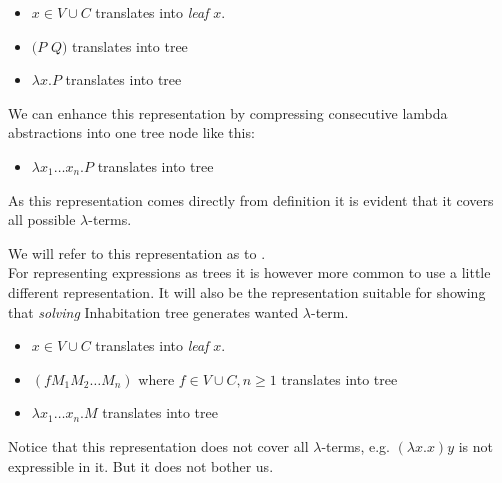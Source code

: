 \documentclass[12pt,a4paper]{report}
\newcommand{\lterm}{$\lambda$-term\xspace}
\newcommand{\lterms}{$\lambda$-terms\xspace}
\begin{document}
\begin{itemize}
	\item $x \in V \cup C$ translates into \textit{leaf} $x$.
	\item $(P$ $Q)$ translates into tree\\
	\item $\lambda x . P$ translates into tree\\
\end{itemize}

We can enhance this representation by compressing consecutive lambda abstractions into one
tree node like this: 

\begin{itemize}
	\item $\lambda x_1 \dots x_n . P$ translates into tree\\
\end{itemize}

As this representation comes directly from definition it is evident 
that it covers all possible \lterms.

We will refer to this representation as to \textit{\atTree}.\\
 

For representing expressions as trees it is however more common to use a little different
representation. It will also be the representation suitable for showing 
that \textit{solving} Inhabitation tree generates wanted \lterm.

\begin{itemize}
    \item $x \in V \cup C$ translates into \textit{leaf} $x$.
	\item $(f M_1 M_2 \dots M_n)$ where $f \in V \cup C, n \geq 1$ translates into tree\\
	\item $\lambda x_1 \dots x_n . M$ translates into tree\\
\end{itemize}

Notice that this representation does not cover all \lterms, 
e.g. $(\lambda x.x) y$ is not expressible in it. But it does not bother us. 
\end{document}
